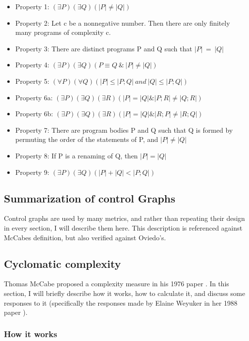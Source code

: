 \documentclass[]{article}
\begin{document}
\begin{itemize}
	\item Property 1: $(\exists P)(\exists Q)(|P|\neq |Q|)$
	\item Property 2: Let c be a nonnegative number. Then there
are only finitely many programs of complexity c.
	\item Property 3: There are distinct programs P and Q such
that $|P| ~= ~|Q|$
	\item Property 4: $(\exists P)(\exists Q)(P \equiv Q ~\& ~|P| \neq |Q|)$
	\item Property 5: $(\forall P)(\forall Q)(|P| \leq |P; Q| ~and ~|Q| \leq |P; Q|)$
	\item Property 6a: $(\exists P)(\exists Q)(\exists R)(|P| = |Q| \& |P;R| \neq |Q; R|)$
	\item Property 6b: $(\exists P)(\exists Q)(\exists R)(|P| = |Q| \& |R;P| \neq |R; Q|)$
	\item Property 7: There are program bodies P and Q such that Q is formed by permuting the order of the statements of P, and $|P| \neq |Q|$
	\item Property 8: If P is a renaming of Q, then $|P| = |Q|$
	\item Property 9: $(\exists P)(\exists Q)(|P|+|Q| < |P; Q|)$
\end{itemize}

\subsection{Summarization of control Graphs}

Control graphs are used by many metrics, and rather than repeating their design in every section, I will describe them here. 
This description is referenced against McCabes definition, but also verified against Oviedo's.



\subsection{Cyclomatic complexity}

Thomas McCabe proposed a complexity measure in his 1976 paper \cite{ref:a_complexity_measure}.
In this section, I will briefly describe how it works, how to calculate it, and discuss some responses to it (specifically the responses made by  Elaine Weyuker in her 1988 paper \cite{ref:evaluating_software_complexity_measures}).

\subsubsection{How it works}
\end{document}

